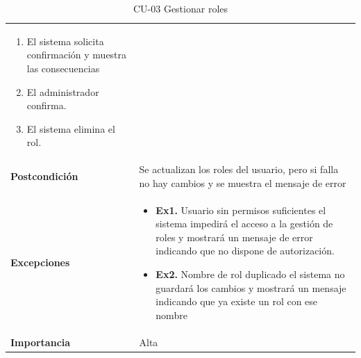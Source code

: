 \begin{table}[p]
\begin{tabularx}{\linewidth}{ p{} p{} }
\begin{enumerate}
\begin{enumerate}[label*=\arabic*., itemsep=0.5pt, topsep=0.5pt, leftmargin=1em]
			\item El sistema solicita confirmación y muestra las consecuencias
			\item El administrador confirma.
			\item El sistema elimina el rol.
			\end{enumerate}
		\end{enumerate}\\
		\textbf{Postcondición}        & Se actualizan los roles del usuario, pero si falla no hay cambios y se muestra el mensaje de error \\
		\textbf{Excepciones}          & 
		{\small
			\begin{itemize}
				\tightlist
				\item \textbf{Ex1.} Usuario sin permisos suficientes \textrightarrow{} el sistema impedirá el acceso a la gestión de roles y mostrará un mensaje de error indicando que no dispone de autorización.
				\item \textbf{Ex2.} Nombre de rol duplicado \textrightarrow{} el sistema no guardará los cambios y mostrará un mensaje indicando que ya existe un rol con ese nombre
			\end{itemize} 
		}\\
		\textbf{Importancia}          & Alta \\
		\bottomrule
	\end{tabularx}
	\caption{CU-03 Gestionar roles}
\end{table}

